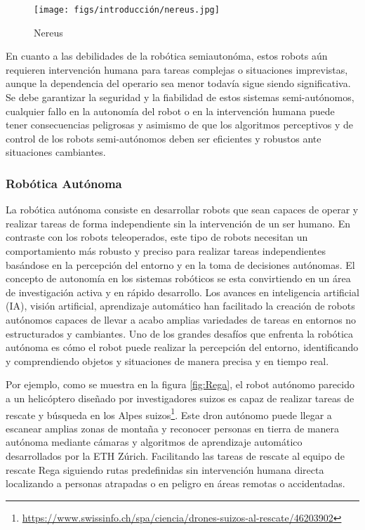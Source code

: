 \begin{figure} [H]
  \begin{center}
    \texttt{[image: figs/introducción/nereus.jpg]}
  \end{center}
  \caption{Nereus}
  \label{fig:Nereus}
  \vspace{-1.5em}
\end{figure}

En cuanto a las debilidades de la robótica semiautonóma, estos robots 
aún requieren intervención humana para tareas complejas o situaciones imprevistas, aunque la dependencia del operario sea menor todavía sigue siendo significativa. 
Se debe garantizar la seguridad y la fiabilidad de estos sistemas semi-autónomos, cualquier fallo en la autonomía del robot 
o en la intervención humana puede tener consecuencias peligrosas y asimismo de que los algoritmos perceptivos y de control de los robots semi-autónomos deben ser eficientes y 
robustos ante situaciones cambiantes.

\subsubsection{Robótica Autónoma}
\label{sec:subseccion}

La robótica autónoma consiste en desarrollar robots que sean capaces de operar y realizar tareas de forma independiente sin la intervención de un ser humano. En contraste con los 
robots teleoperados, este tipo de robots necesitan un comportamiento más robusto y preciso para realizar tareas independientes basándose en la percepción del entorno 
y en la toma de decisiones autónomas.
El concepto de autonomía en los sistemas robóticos se esta convirtiendo en un área de investigación activa y en rápido desarrollo. Los avances en inteligencia artificial (IA), visión 
artificial, aprendizaje automático han facilitado la creación de robots autónomos capaces de llevar a acabo amplias variedades de tareas en entornos no estructurados y cambiantes. 
Uno de los grandes desafíos que enfrenta la robótica autónoma es cómo el robot puede realizar la percepción del entorno, identificando y comprendiendo objetos y situaciones de manera
precisa y en tiempo real. 

Por ejemplo, como se muestra en la figura \ref{fig:Rega}, el robot autónomo parecido a un helicóptero diseñado por investigadores suizos es capaz de realizar tareas de 
rescate y búsqueda en los Alpes suizos\footnote{\url{https://www.swissinfo.ch/spa/ciencia/drones-suizos-al-rescate/46203902}}. Este dron autónomo puede llegar a escanear amplias zonas de montaña y reconocer personas en tierra de manera autónoma mediante
cámaras y algoritmos de aprendizaje automático desarrollados por la ETH Zúrich. Facilitando las tareas de rescate al equipo de rescate Rega siguiendo rutas
predefinidas sin intervención humana directa localizando a personas atrapadas o en peligro en áreas remotas o accidentadas.

